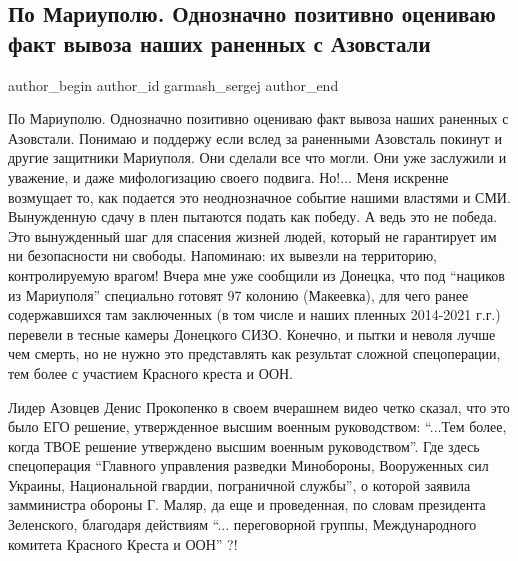  
 
 
 
 
 
\subsection{По Мариуполю. Однозначно позитивно оцениваю факт вывоза наших раненных с Азовстали}
\label{sec:17_05_2022.fb.garmash_sergej.1.po_mariupolju}
 
\ifcmt
 author_begin
   author_id garmash_sergej
 author_end
\fi

По Мариуполю. Однозначно позитивно оцениваю факт вывоза наших раненных с
Азовстали. Понимаю и поддержу если вслед за раненными Азовсталь покинут и
другие защитники Мариуполя. Они сделали все что могли.  Они уже заслужили и
уважение, и даже мифологизацию своего подвига.  Но!... Меня искренне возмущает
то, как подается это неоднозначное событие нашими властями и СМИ. Вынужденную
сдачу в плен пытаются подать как победу. А ведь это не победа. Это вынужденный
шаг для спасения жизней  людей, который не гарантирует им ни безопасности ни
свободы. Напоминаю: их вывезли на территорию, контролируемую врагом!  Вчера мне
уже сообщили из Донецка, что под \enquote{нациков из Мариуполя}  специально
готовят 97 колонию (Макеевка), для чего ранее содержавшихся там заключенных (в
том числе и наших пленных 2014-2021 г.г.) перевели в тесные камеры Донецкого
СИЗО.  Конечно, и пытки и неволя лучше чем смерть, но не нужно это представлять
как результат сложной спецоперации, тем более с участием Красного креста и ООН.

Лидер Азовцев Денис Прокопенко в своем вчерашнем видео четко  сказал, что это
было ЕГО решение, утвержденное высшим военным руководством: \enquote{...Тем более, когда
ТВОЕ решение утверждено высшим военным руководством}.   Где здесь спецоперация
\enquote{Главного управления разведки Минобороны, Вооруженных сил Украины, Национальной
гвардии, пограничной службы}, о которой заявила замминистра обороны Г. Маляр,
да еще и проведенная, по словам президента  Зеленского, благодаря действиям \enquote{...
переговорной группы, Международного комитета Красного Креста и ООН} ?!

